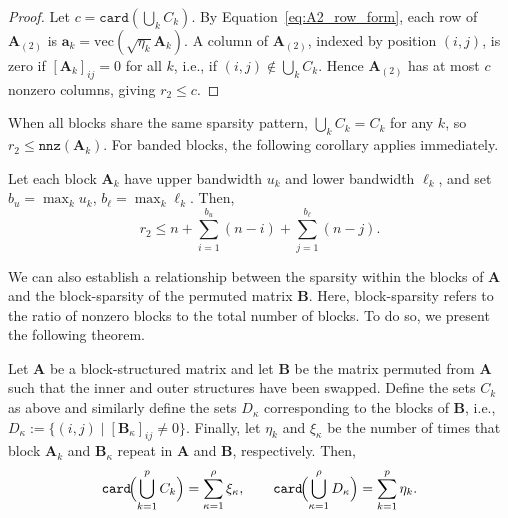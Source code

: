 \documentclass{siamart251216}
\newcommand{\munfold}[2]{\mathbf{#1}_{(#2)}}
\def\bA{\mathbf{A}}
\def\bB{\mathbf{B}}
\def\ba{\mathbf{a}}
\begin{document}
\begin{proof}
Let $c = \mathtt{card}(\bigcup_k C_k)$.  By Equation~\eqref{eq:A2_row_form}, each row of $\munfold{A}{2}$
is $\ba_k = \mathrm{vec}(\sqrt{\eta_k}\bA_k)$.  A column of $\munfold{A}{2}$, indexed by position
$(i,j)$, is zero if $[\bA_k]_{ij}=0$ for all $k$, i.e., if $(i,j)\notin\bigcup_k C_k$.  Hence
$\munfold{A}{2}$ has at most $c$ nonzero columns, giving $r_2 \le c$.
\end{proof}

When all blocks share the same sparsity pattern, $\bigcup_k C_k = C_k$ for any $k$, so
$r_2\le\mathtt{nnz}(\bA_k)$.  For banded blocks, the following corollary applies immediately.

\begin{corollary}
\label{cor:banded}
Let each block $\bA_k$ have upper bandwidth $u_k$ and lower bandwidth $\ell_k$, and set
$b_u = \max_k u_k$, $b_\ell = \max_k\ell_k$.  Then,
\begin{equation*}
    r_2 \le n + \sum_{i=1}^{b_u}(n-i) + \sum_{j=1}^{b_\ell}(n-j).
\end{equation*}
\end{corollary}

We can also establish a relationship between the sparsity within the blocks of $\bA$ and the block-sparsity of the permuted matrix $\bB$. Here, block-sparsity refers to the ratio of nonzero blocks to the total number of blocks. To do so, we present the following theorem.


\begin{theorem}
\label{thm:block_sparse}
   Let $\bA$ be a block-structured matrix and let $\bB$ be the matrix permuted from $\bA$ such that the inner and outer structures have been swapped. Define the sets $C_k$ as above and similarly define the sets $D_\kappa$ corresponding to the blocks of $\bB$, i.e., $D_\kappa := \{(i,j)\mid[\bB_\kappa]_{ij}\ne 0\}$.   Finally, let $\eta_k$ and $\xi_\kappa$ be the number of times that block $\bA_k$ and $\bB_\kappa$ repeat in $\bA$ and $\bB$, respectively.  Then, 
\begin{equation*}   \mathtt{card}\!\Bigl(\bigcup_{k=1}^p C_k\Bigr) = \sum_{\kappa=1}^\rho\xi_\kappa,
    \qquad
    \mathtt{card}\!\Bigl(\bigcup_{\kappa=1}^\rho D_\kappa\Bigr) = \sum_{k=1}^p\eta_k.
\end{equation*}
\end{theorem}
\end{document}
